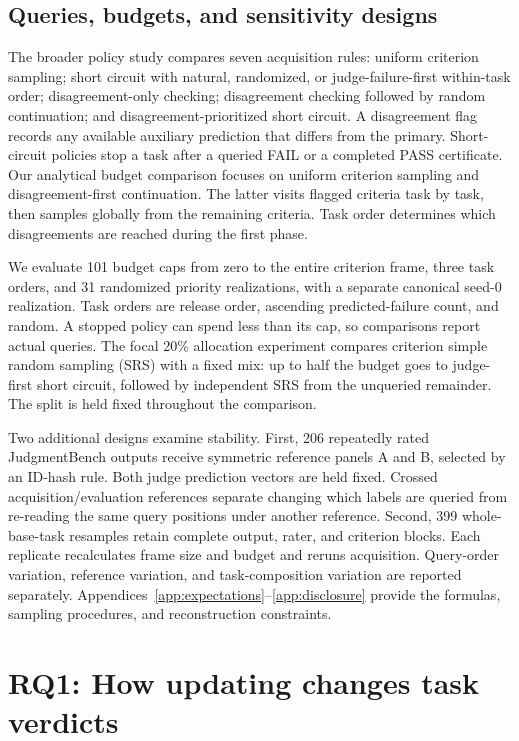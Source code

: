 \documentclass[10pt,letterpaper]{article}
\begin{document}
\subsection{Queries, budgets, and sensitivity designs}
The broader policy study compares seven acquisition rules: uniform criterion sampling; short circuit with natural, randomized, or judge-failure-first within-task order; disagreement-only checking; disagreement checking followed by random continuation; and disagreement-prioritized short circuit. A disagreement flag records any available auxiliary prediction that differs from the primary. Short-circuit policies stop a task after a queried FAIL or a completed PASS certificate. Our analytical budget comparison focuses on uniform criterion sampling and disagreement-first continuation. The latter visits flagged criteria task by task, then samples globally from the remaining criteria. Task order determines which disagreements are reached during the first phase.

We evaluate 101 budget caps from zero to the entire criterion frame, three task orders, and 31 randomized priority realizations, with a separate canonical seed-0 realization. Task orders are release order, ascending predicted-failure count, and random. A stopped policy can spend less than its cap, so comparisons report actual queries. The focal 20\% allocation experiment compares criterion simple random sampling (SRS) with a fixed mix: up to half the budget goes to judge-first short circuit, followed by independent SRS from the unqueried remainder. The split is held fixed throughout the comparison.

Two additional designs examine stability. First, 206 repeatedly rated JudgmentBench outputs receive symmetric reference panels A and B, selected by an ID-hash rule. Both judge prediction vectors are held fixed. Crossed acquisition/evaluation references separate changing which labels are queried from re-reading the same query positions under another reference. Second, 399 whole-base-task resamples retain complete output, rater, and criterion blocks. Each replicate recalculates frame size and budget and reruns acquisition. Query-order variation, reference variation, and task-composition variation are reported separately. Appendices~\ref{app:expectations}--\ref{app:disclosure} provide the formulas, sampling procedures, and reconstruction constraints.

\section{RQ1: How updating changes task verdicts}\label{sec:rq1}
\end{document}
